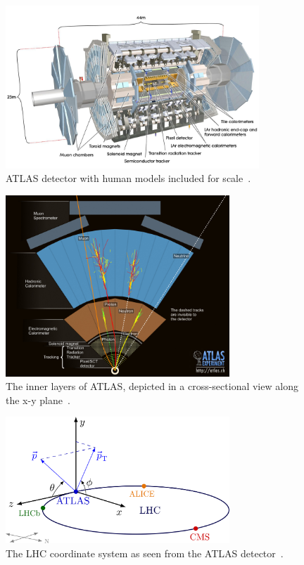 \begin{figure}[ht]
    \centering
    \includegraphics[width=0.85\textwidth]{figures/LHC/atlas_scale.jpg}
    \caption[]{ATLAS detector with human models included for scale~\cite{Pequenao:1095924}.}
    \label{fig:atlas_scale}
\end{figure}

\begin{figure}[ht]
    \centering
    \includegraphics[width=0.75\textwidth]{figures/LHC/atlas_cross.jpg}
    \caption[]{The inner layers of ATLAS, depicted in a cross-sectional view along the x-y plane~\cite{Pequenao:1095924}.}
    \label{fig:atlas_cross}
\end{figure}

\begin{figure}[ht]
\centering
\includegraphics[width=0.75\textwidth]{figures/LHC/axis3D_CMS-003.png}
\caption[The LHC coordinate system]{The LHC coordinate system as seen from the ATLAS detector~\cite{neutelings2023lhc}.}
\label{fig:atlas_coordinate}
\end{figure}

